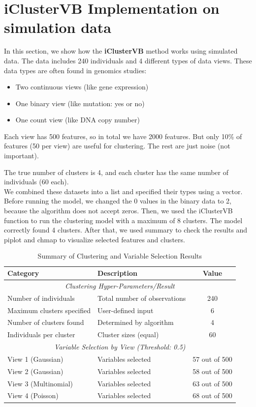 \section{iClusterVB Implementation on simulation data}

In this section, we show how the \textbf{iClusterVB} method works using simulated  data. 
The data includes 240 individuals and 4 different types of data views. 
These data types are often found in genomics studies:

\begin{itemize}
  \item Two continuous views (like gene expression)
  \item One binary view (like mutation: yes or no)
  \item One count view (like DNA copy number)
\end{itemize}

Each view has 500 features, so in total we have 2000 features. But only 10\% of features (50 per view) are useful for clustering. The rest are just noise (not important).

The true number of clusters is 4, and each cluster has the same number of individuals (60 each).
\\

We combined these datasets into a list and specified their types using a vector. Before running the model, we changed the 0 values in the binary data to 2, because the algorithm does not accept zeros. 
Then, we used the iClusterVB function to run the clustering model with a maximum of 8 clusters.
The model correctly found 4 clusters. After that, we used summary to check the results and piplot and 
chmap to visualize selected features and clusters. 

\begin{table}[!h]
  \centering
  \caption{Summary of Clustering and Variable Selection Results}
  \label{tab:clustering_summary}
  \begin{tabular}{llc}
  \toprule
  \textbf{Category} & \textbf{Description} & \textbf{Value} \\
  \midrule
  \multicolumn{3}{c}{\textit{Clustering Hyper-Parameters/Result}} \\
  \midrule
  Number of individuals & Total number of observations & 240 \\
  Maximum clusters specified & User-defined input & 6 \\
  Number of clusters found & Determined by algorithm & 4 \\
  Individuals per cluster & Cluster sizes (equal) & 60 \\
  \midrule
  \multicolumn{3}{c}{\textit{Variable Selection by View (Threshold: 0.5)}} \\
  \midrule
  View 1 (Gaussian) & Variables selected & 57 out of 500 \\
  View 2 (Gaussian) & Variables selected & 58 out of 500 \\
  View 3 (Multinomial) & Variables selected & 63 out of 500 \\
  View 4 (Poisson) & Variables selected & 68 out of 500 \\
  \bottomrule
\end{tabular}
\end{table}

